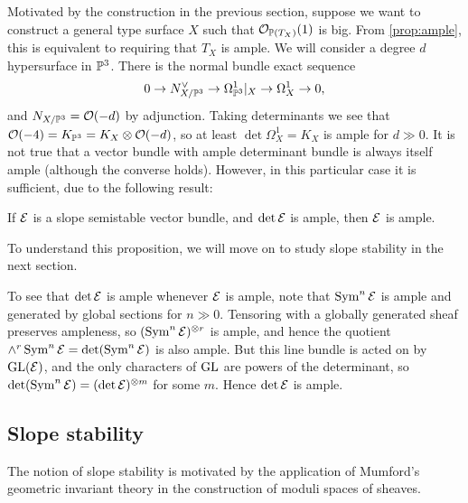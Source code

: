 Motivated by the construction in the previous section, suppose we want to
construct a general type surface $X$ such that $\O_{\P(T_X)}(1)$ is big. From
\cref{prop:ample}, this is equivalent to requiring that $T_X$ is ample. We will
consider a degree $d$ hypersurface in $\P^3$. There is the normal bundle exact
sequence
\begin{equation*}
    0 \to N_{X/\P^3}^\vee \to \Omega^1_{\P^3}|_X \to \Omega^1_X \to 0,
\end{equation*}
and $N_{X/\P^3}=\O(-d)$ by adjunction. Taking determinants we see that
$\O(-4)=K_{\P^3}=K_X\otimes\O(-d)$, so at least $\det\Omega^1_X=K_X$ is ample
for $d\gg0$. It is not true that a vector bundle with ample determinant bundle
is always itself ample (although the converse holds). However, in this
particular case it is sufficient, due to the following result:


\begin{proposition}\label{prop:stable ample}
    If $\calE$ is a slope semistable vector bundle, and $\det\calE$ is ample,
    then $\calE$ is ample.
\end{proposition}

To understand this proposition, we will move on to study slope stability in the
next section.

\begin{remark}
    To see that $\det\calE$ is ample whenever $\calE$ is ample, note that
    $\Sym^n\calE$ is ample and generated by global sections for $n\gg0$.
    Tensoring with a globally generated sheaf preserves ampleness, so
    $(\Sym^n\calE)^{\otimes r}$ is ample, and hence the quotient
    $\wedge^r\Sym^n\calE=\det(\Sym^n\calE)$ is also ample. But this line bundle
    is acted on by $\GL(\calE)$, and the only characters of $\GL$ are powers of
    the determinant, so $\det(\Sym^n\calE)=(\det\calE)^{\otimes m}$ for some
    $m$. Hence $\det\calE$ is ample.
\end{remark}

\subsection{Slope stability}

The notion of slope stability is motivated by the application of Mumford's
geometric invariant theory in the construction of moduli spaces of sheaves.

